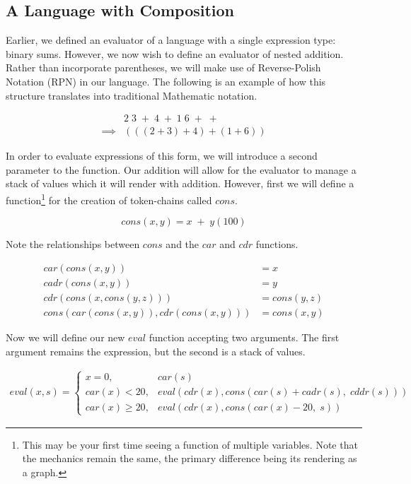 \documentclass{article}
\begin{document}
\subsection{A Language with Composition}
Earlier, we defined an evaluator of a language with a single expression type: binary sums. However, we
now wish to define an evaluator of nested addition. Rather than incorporate parentheses, we will make
use of Reverse-Polish Notation (RPN) in our language. The following is an example of how this structure 
translates into traditional Mathematic notation.

\begin{align*}
    &2 \; 3 \; + \; 4 \; + \; 1 \; 6 \; + \; +
\\  \implies &(((2 + 3) + 4) + (1 + 6))
\end{align*}

In order to evaluate expressions of this form, we will introduce a second parameter to the function. Our
addition will allow for the evaluator to manage a stack of values which it will render with addition.
However, first we will define a function\footnote{This may be your first time seeing a function of multiple 
variables. Note that the mechanics remain the same, the primary difference being its rendering as a graph.} 
for the creation of token-chains called $cons$.

$$cons(x, y) = x \; + \; y(100)$$

Note the relationships between $cons$ and the $car$ and $cdr$ functions.

\begin{align*}
    car(cons(x, y)) &= x
\\  cadr(cons(x, y)) &= y
\\  cdr(cons(x, cons(y, z))) &= cons(y, z)
\\  cons(car(cons(x, y)), cdr(cons(x, y))) &= cons(x, y)
\end{align*}

Now we will define our new $eval$ function accepting two arguments. The first argument remains the 
expression, but the second is a stack of values.

\begin{align*}
eval(x, s) = \left\{
  \begin{array}{lr}
        x = 0, &car(s)
    \\  car(x) < 20, &eval(cdr(x), cons(car(s) + cadr(s), \; cddr(s)))
    \\  car(x) \ge 20, &eval(cdr(x), cons(car(x) - 20, \; s))
  \end{array}
\right.
\end{align*}
\end{document}
